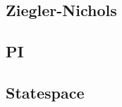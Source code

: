 \documentclass[../../../main]{subfiles}
\begin{document}
\subsection{Ziegler-Nichols}%
\label{sub:ziegler_nichols}




\subsection{PI}%
\label{sub:pi}



\subsection{Statespace}%
\label{sub:statespace}

\end{document}

